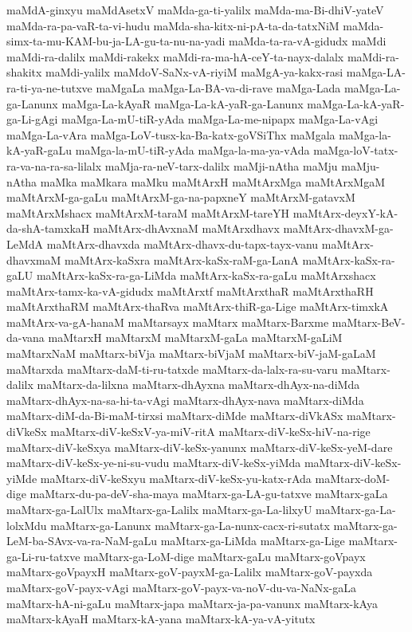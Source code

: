 {maMdA-ginxyu
maMdAsetxV
maMda-ga-ti-yalilx
maMda-ma-Bi-dhiV-yateV
maMda-ra-pa-vaR-ta-vi-hudu
maMda-sha-kitx-ni-pA-ta-da-tatxNiM
maMda-simx-ta-mu-KAM-bu-ja-LA-gu-ta-nu-na-yadi
maMda-ta-ra-vA-gidudx
maMdi
maMdi-ra-dalilx
maMdi-rakekx
maMdi-ra-ma-hA-ceY-ta-nayx-dalalx
maMdi-ra-shakitx
maMdi-yalilx
maMdoV-SaNx-vA-riyiM
maMgA-ya-kakx-rasi
maMga-LA-ra-ti-ya-ne-tutxve
maMgaLa
maMga-La-BA-va-di-rave
maMga-Lada
maMga-La-ga-Lanunx
maMga-La-kAyaR
maMga-La-kA-yaR-ga-Lanunx
maMga-La-kA-yaR-ga-Li-gAgi
maMga-La-mU-tiR-yAda
maMga-La-me-nipapx
maMga-La-vAgi
maMga-La-vAra
maMga-LoV-tusx-ka-Ba-katx-goVSiThx
maMgala
maMga-la-kA-yaR-gaLu
maMga-la-mU-tiR-yAda
maMga-la-ma-ya-vAda
maMga-loV-tatx-ra-va-na-ra-sa-lilalx
maMja-ra-neV-tarx-dalilx
maMji-nAtha
maMju
maMju-nAtha
maMka
maMkara
maMku
maMtArxH
maMtArxMga
maMtArxMgaM
maMtArxM-ga-gaLu
maMtArxM-ga-na-papxneY
maMtArxM-gatavxM
maMtArxMshacx
maMtArxM-taraM
maMtArxM-tareYH
maMtArx-deyxY-kA-da-shA-tamxkaH
maMtArx-dhAvxnaM
maMtArxdhavx
maMtArx-dhavxM-ga-LeMdA
maMtArx-dhavxda
maMtArx-dhavx-du-tapx-tayx-vanu
maMtArx-dhavxmaM
maMtArx-kaSxra
maMtArx-kaSx-raM-ga-LanA
maMtArx-kaSx-ra-gaLU
maMtArx-kaSx-ra-ga-LiMda
maMtArx-kaSx-ra-gaLu
maMtArxshacx
maMtArx-tamx-ka-vA-gidudx
maMtArxtf
maMtArxthaR
maMtArxthaRH
maMtArxthaRM
maMtArx-thaRva
maMtArx-thiR-ga-Lige
maMtArx-timxkA
maMtArx-va-gA-hanaM
maMtarsayx
maMtarx
maMtarx-Barxme
maMtarx-BeV-da-vana
maMtarxH
maMtarxM
maMtarxM-gaLa
maMtarxM-gaLiM
maMtarxNaM
maMtarx-biVja
maMtarx-biVjaM
maMtarx-biV-jaM-gaLaM
maMtarxda
maMtarx-daM-ti-ru-tatxde
maMtarx-da-lalx-ra-su-varu
maMtarx-dalilx
maMtarx-da-lilxna
maMtarx-dhAyxna
maMtarx-dhAyx-na-diMda
maMtarx-dhAyx-na-sa-hi-ta-vAgi
maMtarx-dhAyx-nava
maMtarx-diMda
maMtarx-diM-da-Bi-maM-tirxsi
maMtarx-diMde
maMtarx-diVkASx
maMtarx-diVkeSx
maMtarx-diV-keSxV-ya-miV-ritA
maMtarx-diV-keSx-hiV-na-rige
maMtarx-diV-keSxya
maMtarx-diV-keSx-yanunx
maMtarx-diV-keSx-yeM-dare
maMtarx-diV-keSx-ye-ni-su-vudu
maMtarx-diV-keSx-yiMda
maMtarx-diV-keSx-yiMde
maMtarx-diV-keSxyu
maMtarx-diV-keSx-yu-katx-rAda
maMtarx-doM-dige
maMtarx-du-pa-deV-sha-maya
maMtarx-ga-LA-gu-tatxve
maMtarx-gaLa
maMtarx-ga-LalUlx
maMtarx-ga-Lalilx
maMtarx-ga-La-lilxyU
maMtarx-ga-La-lolxMdu
maMtarx-ga-Lanunx
maMtarx-ga-La-nunx-cacx-ri-sutatx
maMtarx-ga-LeM-ba-SAvx-va-ra-NaM-gaLu
maMtarx-ga-LiMda
maMtarx-ga-Lige
maMtarx-ga-Li-ru-tatxve
maMtarx-ga-LoM-dige
maMtarx-gaLu
maMtarx-goVpayx
maMtarx-goVpayxH
maMtarx-goV-payxM-ga-Lalilx
maMtarx-goV-payxda
maMtarx-goV-payx-vAgi
maMtarx-goV-payx-va-noV-du-va-NaNx-gaLa
maMtarx-hA-ni-gaLu
maMtarx-japa
maMtarx-ja-pa-vanunx
maMtarx-kAya
maMtarx-kAyaH
maMtarx-kA-yana
maMtarx-kA-ya-vA-yitutx
}
